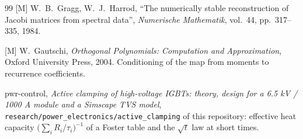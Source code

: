\documentclass[10pt,a4paper]{scrartcl}
\begin{document}
\begin{thebibliography}{99}
[M] W.~B.~Gragg, W.~J.~Harrod, ``The numerically stable reconstruction of Jacobi matrices from spectral data'', \emph{Numerische Mathematik}, vol.~44, pp.~317--335, 1984.

[M] W.~Gautschi, \emph{Orthogonal Polynomials: Computation and Approximation}, Oxford University Press, 2004. Conditioning of the map from moments to recurrence coefficients.

pwr-control, \emph{Active clamping of high-voltage IGBTs: theory, design for a 6.5 kV / 1000 A module and a Simscape TVS model}, \texttt{research/power\_electronics/active\_clamping} of this repository: effective heat capacity $\bigl(\sum_i R_i/\tau_i\bigr)^{-1}$ of a Foster table and the $\sqrt{t}$ law at short times.

\end{thebibliography}
\end{document}
